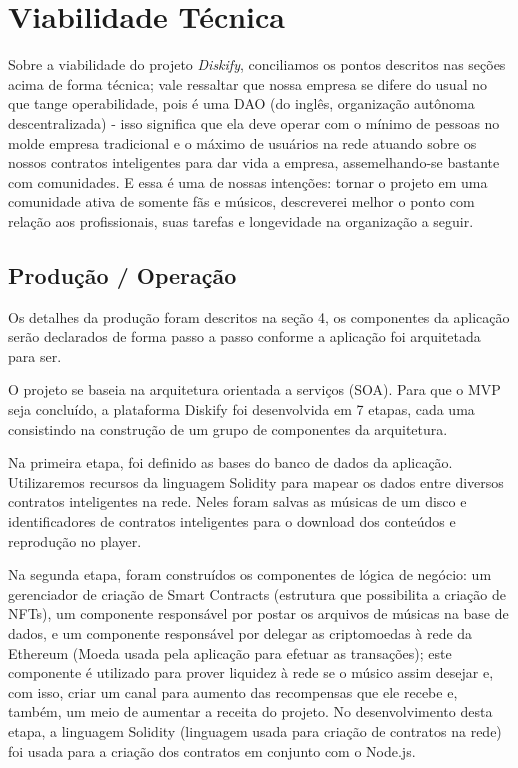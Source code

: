 \documentclass[onecolumn,12pt]{asme2ej}
\begin{document}
\section{Viabilidade Técnica}

Sobre a viabilidade do projeto {\it Diskify}, conciliamos os pontos descritos nas seções acima de forma técnica; vale ressaltar que nossa empresa se difere do usual no que tange operabilidade, pois é uma DAO (do inglês, organização autônoma descentralizada) - isso significa que ela deve operar com o mínimo de pessoas no molde empresa tradicional e o máximo de usuários na rede atuando sobre os nossos contratos inteligentes para dar vida a empresa, assemelhando-se bastante com comunidades. E essa é uma de nossas intenções: tornar o projeto em uma comunidade ativa de somente fãs e músicos, descreverei melhor o ponto com relação aos profissionais, suas tarefas e longevidade na organização a seguir.

\subsection{Produção / Operação}
 
Os detalhes da produção foram descritos na seção 4, os componentes da aplicação serão declarados de forma passo a passo conforme a aplicação foi arquitetada para ser.
 
O projeto se baseia na arquitetura orientada a serviços (SOA). Para que o MVP seja concluído, a plataforma Diskify foi desenvolvida em 7 etapas, cada uma consistindo na construção de um grupo de componentes da arquitetura. 

Na primeira etapa, foi definido as bases do banco de dados da aplicação. Utilizaremos recursos da linguagem Solidity para mapear os dados entre diversos contratos inteligentes na rede. Neles foram salvas as músicas de um disco e identificadores de contratos inteligentes para o download dos conteúdos e reprodução no player.

Na segunda etapa, foram construídos os componentes de lógica de negócio: um gerenciador de criação de Smart Contracts (estrutura que possibilita a criação de NFTs), um componente responsável por postar os arquivos de músicas na base de dados, e um componente responsável por delegar as criptomoedas à rede da Ethereum (Moeda usada pela aplicação para efetuar as transações); este componente é utilizado para prover liquidez à rede se o músico assim desejar e, com isso, criar um canal para aumento das recompensas que ele recebe e, também, um meio de aumentar a receita do projeto. No desenvolvimento desta etapa, a linguagem Solidity (linguagem usada para criação de contratos na rede) foi usada para a criação dos contratos em conjunto com o Node.js.
\end{document}
